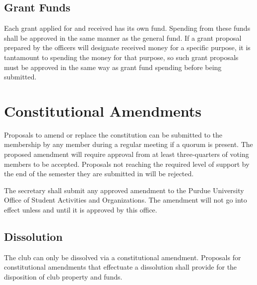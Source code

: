 \documentclass{article}
\begin{document}
\subsection{Grant Funds}

Each grant applied for and received has its own fund. Spending from these funds
shall be approved in the same manner as the general fund. If a grant proposal
prepared by the officers will designate received money for a specific purpose,
it is tantamount to spending the money for that purpose, so such grant proposals
must be approved in the same way as grant fund spending before being submitted.

\section{Constitutional Amendments}

Proposals to amend or replace the constitution can be submitted to the
membership by any member during a regular meeting if a quorum is present. The
proposed amendment will require approval from at least three-quarters of voting
members to be accepted. Proposals not reaching the required level of support by
the end of the semester they are submitted in will be rejected.

The secretary shall submit any approved amendment to the Purdue University
Office of Student Activities and Organizations. The amendment will not go into
effect unless and until it is approved by this office.

\subsection{Dissolution}

The club can only be dissolved via a constitutional amendment. Proposals for
constitutional amendments that effectuate a dissolution shall provide for the
disposition of club property and funds.




\end{document}
